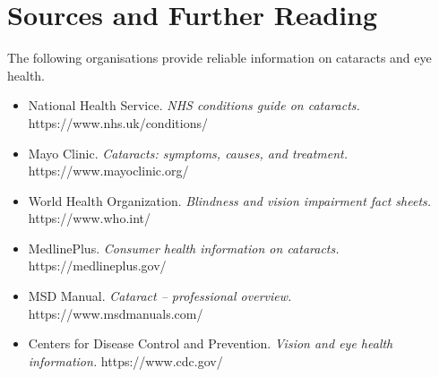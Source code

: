 \section*{Sources and Further Reading}
The following organisations provide reliable information on cataracts and eye health.

\begin{itemize}
    \item National Health Service. \textit{NHS conditions guide on cataracts.} https://www.nhs.uk/conditions/
    \item Mayo Clinic. \textit{Cataracts: symptoms, causes, and treatment.} https://www.mayoclinic.org/
    \item World Health Organization. \textit{Blindness and vision impairment fact sheets.} https://www.who.int/
    \item MedlinePlus. \textit{Consumer health information on cataracts.} https://medlineplus.gov/
    \item MSD Manual. \textit{Cataract -- professional overview.} https://www.msdmanuals.com/
    \item Centers for Disease Control and Prevention. \textit{Vision and eye health information.} https://www.cdc.gov/
\end{itemize}
